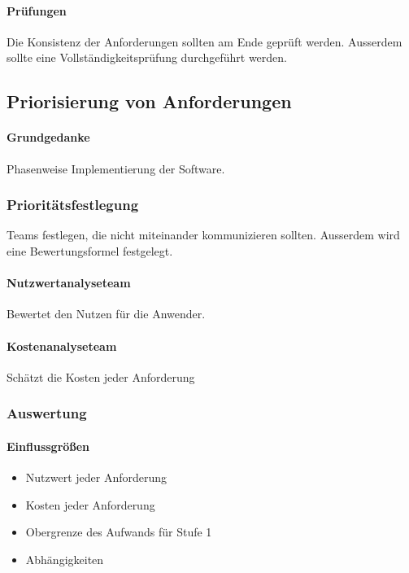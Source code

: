 \paragraph{Prüfungen}
Die Konsistenz der Anforderungen sollten am Ende geprüft werden. Ausserdem sollte eine Vollständigkeitsprüfung durchgeführt werden.

\subsection{Priorisierung von Anforderungen}

\paragraph{Grundgedanke}
Phasenweise Implementierung der Software. 

\subsubsection{Prioritätsfestlegung}
Teams festlegen, die nicht miteinander kommunizieren sollten. Ausserdem wird eine Bewertungsformel festgelegt.

\paragraph{Nutzwertanalyseteam}
Bewertet den Nutzen für die Anwender.

\paragraph{Kostenanalyseteam}
Schätzt die Kosten jeder Anforderung


\subsubsection{Auswertung}

\paragraph{Einflussgrößen}
\begin{itemize}
\item Nutzwert jeder Anforderung
\item Kosten jeder Anforderung
\item Obergrenze des Aufwands für Stufe 1
\item Abhängigkeiten
\end{itemize}

